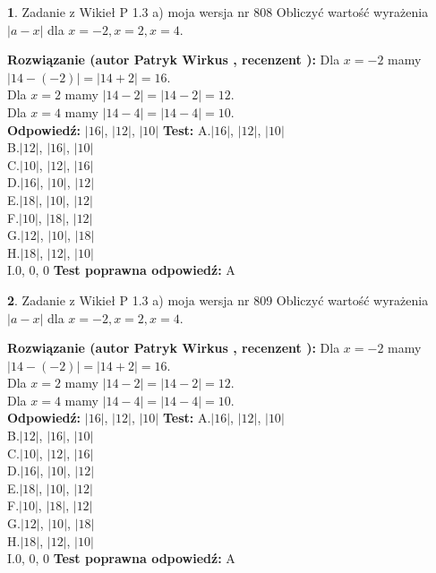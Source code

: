 \documentclass[12pt, a4paper]{article}
\theoremstyle{definition} %
\newtheorem{zad}{}
\newcommand{\zadStart}[1]{\begin{zad}#1\newline}
\newcommand{\zadStop}{\end{zad}}
\newcommand{\rozwStart}[2]{\noindent \textbf{Rozwiązanie (autor #1 , recenzent #2): }\newline}
\newcommand{\rozwStop}{\newline}
\newcommand{\odpStart}{\noindent \textbf{Odpowiedź:}\newline}
\newcommand{\odpStop}{\newline}
\newcommand{\testStart}{\noindent \textbf{Test:}\newline}
\newcommand{\testStop}{\newline}
\newcommand{\kluczStart}{\noindent \textbf{Test poprawna odpowiedź:}\newline}
\newcommand{\kluczStop}{\newline}
\begin{document}
\zadStart{Zadanie z Wikieł P 1.3 a) moja wersja nr 808}
Obliczyć wartość wyrażenia $|a - x|$ dla $x=-2,x=2,x=4$.
\zadStop
\rozwStart{Patryk Wirkus}{}
Dla $x = -2$ mamy $|14 - (-2)| = |14 + 2| = 16$.\\
Dla $x = 2$ mamy $|14 - 2| = |14 - 2| = 12$.\\
Dla $x = 4$ mamy $|14 - 4| = |14 - 4| = 10$.\\
\rozwStop
\odpStart
$|16|$, $|12|$, $|10|$
\odpStop
\testStart
A.$|16|$, $|12|$, $|10|$\\
B.$|12|$, $|16|$, $|10|$\\
C.$|10|$, $|12|$, $|16|$\\
D.$|16|$, $|10|$, $|12|$\\
E.$|18|$, $|10|$, $|12|$\\
F.$|10|$, $|18|$, $|12|$\\
G.$|12|$, $|10|$, $|18|$\\
H.$|18|$, $|12|$, $|10|$\\
I.$0$, $0$, $0$
\testStop
\kluczStart
A
\kluczStop



\zadStart{Zadanie z Wikieł P 1.3 a) moja wersja nr 809}
Obliczyć wartość wyrażenia $|a - x|$ dla $x=-2,x=2,x=4$.
\zadStop
\rozwStart{Patryk Wirkus}{}
Dla $x = -2$ mamy $|14 - (-2)| = |14 + 2| = 16$.\\
Dla $x = 2$ mamy $|14 - 2| = |14 - 2| = 12$.\\
Dla $x = 4$ mamy $|14 - 4| = |14 - 4| = 10$.\\
\rozwStop
\odpStart
$|16|$, $|12|$, $|10|$
\odpStop
\testStart
A.$|16|$, $|12|$, $|10|$\\
B.$|12|$, $|16|$, $|10|$\\
C.$|10|$, $|12|$, $|16|$\\
D.$|16|$, $|10|$, $|12|$\\
E.$|18|$, $|10|$, $|12|$\\
F.$|10|$, $|18|$, $|12|$\\
G.$|12|$, $|10|$, $|18|$\\
H.$|18|$, $|12|$, $|10|$\\
I.$0$, $0$, $0$
\testStop
\kluczStart
A
\kluczStop
\end{document}
